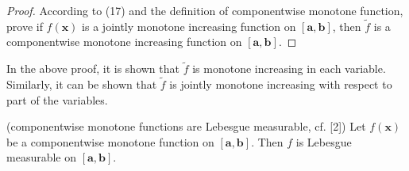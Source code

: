 \documentclass{ijclclp}
\begin{document}
\begin{proof}
    According to (17) and the definition of componentwise monotone function, prove if \(f(\boldsymbol{x})\) is a jointly monotone increasing function on \([\boldsymbol{a},\boldsymbol{b}]\), then \(\widetilde{f}\) is a componentwise monotone increasing function on \([\boldsymbol{a},\boldsymbol{b}]\).
\end{proof}

In the above proof, it is shown that \(\widetilde{f}\) is monotone increasing in each variable. Similarly, it can be shown that \(\widetilde{f}\) is jointly monotone increasing with respect to part of the variables. 

\begin{lemma}{(componentwise monotone functions are Lebesgue measurable, cf. [2])} 
    Let \(f(\boldsymbol{x})\) be a componentwise monotone function on \([\boldsymbol{a},\boldsymbol{b}]\). Then \(f\) is Lebesgue measurable on \([\boldsymbol{a},\boldsymbol{b}]\).\\[-0.5em]
\end{lemma}
\end{document}
